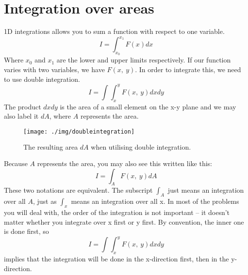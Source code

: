 \section{Integration over areas}
1D integrations allows you to sum a function with respect to one variable.
\begin{equation}
  I = \int_{x_0}^{x_1} F(x) dx
\end{equation}
Where $x_0$ and $x_1$ are the lower and upper limits respectively. If our function varies with two variables, we have $F(x, \ y)$. In order to integrate this, we need to use double integration.
\begin{equation}
  I = \int \int_x^y F(x, \ y)dxdy
\end{equation}
The product $dxdy$ is the area of a small element on the x-y plane and we may also label it $dA$, where $A$ represents the area.
\begin{figure}
  \centering
  \texttt{[image: ./img/doubleintegration]}
  \caption{The resulting area $dA$ when utilising double integration.}
\end{figure}
Because $A$ represents the area, you may also see this written like this:
\begin{equation}
  I = \int_A F(x, \ y) dA
\end{equation}
These two notations are equivalent. The subscript $\int_A$ just means an integration over all $A$, just as $\int_x$ means an integration over all x.
In most of the problems you will deal with, the order of the integration is not important – it doesn’t matter whether you integrate over x first or y first.
By convention, the inner one is done first, so
\begin{equation}
  I = \int \int_x^y F(x, \ y) dxdy
\end{equation}
implies that the integration will be done in the x-direction first, then in the y-direction.


